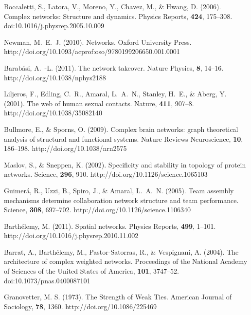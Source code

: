 \documentclass[aps,twocolumn,superscriptaddress]{revtex4-1}
\begin{document}
\begin{thebibliography}{99}


 Boccaletti, S., Latora, V., Moreno, Y., Chavez, M., \& Hwang, D. (2006). Complex networks: Structure and dynamics. Physics Reports, {\bf 424}, 175--308. doi:10.1016/j.physrep.2005.10.009

 Newman, M.~E.~J. (2010). Networks. Oxford University Press. http://doi.org/10.1093/acprof:oso/9780199206650.001.0001

 Barab\'asi, A.~-L. (2011). The network takeover. Nature Physics, {\bf 8}, 14--16. http://doi.org/10.1038/nphys2188


 Liljeros, F., Edling, C.~R., Amaral, L.~A.~N., Stanley, H.~E., \& Aberg, Y. (2001). The web of human sexual contacts. Nature, {\bf 411}, 907--8. http://doi.org/10.1038/35082140


 Bullmore, E., \& Sporns, O. (2009). Complex brain networks: graph theoretical analysis of structural and functional systems. Nature Reviews Neuroscience, {\bf 10}, 186--198. http://doi.org/10.1038/nrn2575


 Maslov, S., \& Sneppen, K. (2002). Specificity and stability in topology of protein networks. Science, {\bf 296}, 910. http://doi.org/10.1126/science.1065103


 Guimer\'a, R., Uzzi, B., Spiro, J., \& Amaral, L.~A.~N. (2005). Team assembly mechanisms determine collaboration network structure and team performance. Science, {\bf 308}, 697--702. http://doi.org/10.1126/science.1106340


 Barth\'elemy, M. (2011). Spatial networks. Physics Reports, {\bf 499}, 1--101. http://doi.org/10.1016/j.physrep.2010.11.002


 Barrat, A., Barth\'elemy, M., Pastor-Satorras, R., \& Vespignani, A. (2004). The architecture of complex weighted networks. Proceedings of the National Academy of Sciences of the United States of America, {\bf 101}, 3747--52. doi:10.1073/pnas.0400087101


 Granovetter, M. S. (1973). The Strength of Weak Ties. American Journal of Sociology, {\bf 78}, 1360. http://doi.org/10.1086/225469



\end{thebibliography}
\end{document}

